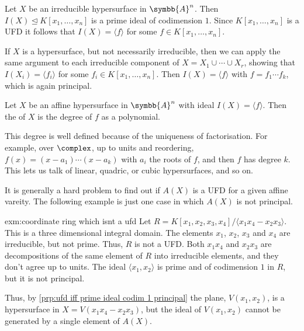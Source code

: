 \documentclass[fleqn]{NotesClass}
\newcommand{\subideal}{\trianglelefteq}
\newcommand{\affine}{\symbb{A}}
\begin{document}
    Let \(X\) be an irreducible hypersurface in \(\affine^n\).
    Then \(I(X) \subideal K[x_1, \dotsc, x_n]\) is a prime ideal of codimension \(1\).
    Since \(K[x_1, \dotsc, x_n]\) is a UFD it follows that \(I(X) = \langle f \rangle\) for some \(f \in K[x_1, \dotsc, x_n]\).
    
    If \(X\) is a hypersurface, but not necessarily irreducible, then we can apply the same argument to each irreducible component of \(X = X_1 \cup \dotsb \cup X_r\), showing that \(I(X_i) = \langle f_i \rangle\) for some \(f_i \in K[x_1, \dotsc, x_n]\).
    Then \(I(X) = \langle f \rangle\) with \(f = f_1 \dotsm f_k\), which is again principal.
    
    \begin{dfn}{}{}
        Let \(X\) be an affine hypersurface in \(\affine^n\) with ideal \(I(X) = \langle f \rangle\).
        Then the  of \(X\) is the degree of \(f\) as a polynomial.
    \end{dfn}
    
    This degree is well defined because of the uniqueness of factorisation.
    For example, over \(\complex\), up to units and reordering, \(f(x) = (x - a_1) \dotsm (x - a_k)\) with \(a_i\) the roots of \(f\), and then \(f\) has degree \(k\).
    This lets us talk of linear, quadric, or cubic hypersurfaces, and so on.
    
    It is generally a hard problem to find out if \(A(X)\) is a UFD for a given affine vareity.
    The following example is just one case in which \(A(X)\) is not principal.
    
    \begin{exm}{}{exm:coordinate ring which isnt a ufd}
        Let \(R = K[x_1, x_2, x_3, x_4] / \langle x_1x_4 - x_2x_3 \rangle\).
        This is a three dimensional integral domain.
        The elements \(x_1\), \(x_2\), \(x_3\) and \(x_4\) are irreducible, but not prime.
        Thus, \(R\) is not a UFD.
        Both \(x_1x_4\) and \(x_2x_3\) are decompositions of the same element of \(R\) into irreducible elements, and they don't agree up to units.
        The ideal \(\langle x_1, x_2\rangle\) is prime and of codimension \(1\) in \(R\), but it is not principal.
        
        Thus, by \cref{prp:ufd iff prime ideal codim 1 principal} the plane, \(V(x_1, x_2)\), is a hypersurface in \(X = V(x_1x_4 - x_2x_3)\), but the ideal of \(V(x_1, x_2)\) cannot be generated by a single element of \(A(X)\).
    \end{exm}
    
\end{document}
